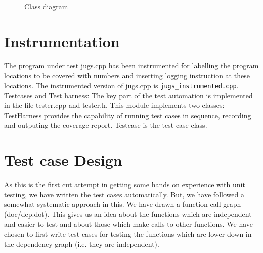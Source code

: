 \documentclass[12pts]{report}
\begin{document}
\begin{figure}[b]
\begin{center}
\end{center}
\caption{Class diagram}
\label{f:class}
\end{figure}

\section{Instrumentation}
The program under test jugs.cpp has been instrumented for
labelling the program locations to be covered with numbers and inserting
logging instruction at these locations. The instrumented version of jugs.cpp
is \lstinline|jugs_instrumented.cpp|.
Testcases and Test harness: The key part of the test automation is implemented
in the file tester.cpp and tester.h. This module implements two classes:
TestHarness provides the capability of running test cases in sequence, recording
and outputing the coverage report. Testcase is the test case class.

\section{Test case Design}
As this is the first cut attempt in getting some hands on experience with unit testing,
we have written the test cases automatically. But, we have followed a somewhat
systematic approach in this. We have drawn a function call graph (doc/dep.dot).
This gives us an idea about the functions which are independent and easier to
test and about those which make calls to other functions. We have chosen to 
first write test cases for testing the functions which are lower down in the
dependency graph (i.e. they are independent).
\end{document}
